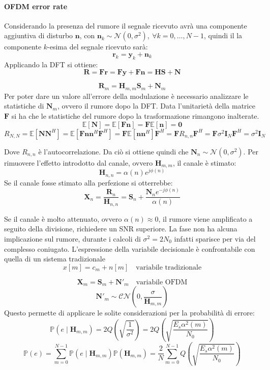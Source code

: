 \paragraph*{OFDM error rate}
Considerando la presenza del rumore il segnale ricevuto avrà una componente aggiuntiva di disturbo $\mathbf{n}$, con $\mathbf{n}_k \sim \mathcal{N}(0, \sigma^2), \ \forall k = 0, \ldots, N-1$, quindi il la componente $k$-esima del segnale ricevuto sarà:
\[
    \mathbf{r}_k = \mathbf{y}_k + \mathbf{n}_k
\]
Applicando la DFT si ottiene:
\[
    \mathbf{R} = \mathbf{F}\mathbf{r} = \mathbf{F}\mathbf{y} + \mathbf{F}\mathbf{n} = \mathbf{H}\mathbf{S} + \mathbf{N}
\]

\[
    \mathbf{R}_{m} = \mathbf{H}_{m, m}\mathbf{S}_{m} + \mathbf{N}_{m}
\]
Per poter dare un valore all'errore della modulazione è necessario analizzare le statistiche di $\mathbf{N}_{m}$, ovvero il rumore dopo la DFT.
Data l'unitarietà della matrice $\mathbf{F}$ si ha che le statistiche del rumore dopo la trasformazione rimangono inalterate.
\[
    \mathbb{E}[\mathbf{N}] = \mathbb{E}[\mathbf{F}\mathbf{n}] = \mathbf{F} \mathbb{E}[\mathbf{n}] = \mathbf{0}
\]  
\[
    R_{N,N} = \mathbb{E}[\mathbf{N}\mathbf{N}^H] = \mathbb{E}[\mathbf{F}\mathbf{n}\mathbf{n}^H\mathbf{F}^H] = \mathbf{F}\mathbb{E}[\mathbf{n}\mathbf{n}^H]\mathbf{F}^H = \mathbf{F}R_{n,n}\mathbf{F}^H = \mathbf{F} \sigma^2 \mathbf{I}_N \mathbf{F}^H = \sigma^2 \mathbf{I}_N
\]

Dove $R_{n,n}$ è l'autocorrelazione. Da ciò si ottiene quindi che $\mathbf{N}_{n} \sim \mathcal{N}(0, \sigma^2)$.
Per rimuovere l'effetto introdotto dal canale, ovvero $\mathbf{H}_{m,m}$, il canale è stimato:
\[
    \mathbf{H}_{n, n}= \alpha(n) e^{j\phi(n)}
\]
Se il canale fosse stimato alla perfezione si otterrebbe:
\[
    \mathbf{X}_{n} = \frac{\mathbf{R}_{n}}{\mathbf{H}_{n, n}} = \mathbf{S}_{n} + \frac{\mathbf{N}_{n} e^{-j\phi(n)}}{\alpha(n)}
\]


Se il canale è molto attenuato, ovvero $\alpha(n) \approx 0$, il rumore viene amplificato a seguito della divisione, richiedere un SNR superiore.
La fase non ha alcuna implicazione sul rumore, durante i calcoli di $\sigma ^2=2N_0$ infatti sparisce per via del complesso coniugato.
L'espressione della variabile decisionale è confrontabile con quella di un sistema tradizionale
\[
    x[m] = c_m + n[m] \quad \text{variabile tradizionale}
\]

\[
    \mathbf{X}_{m} = \mathbf{S}_{m} + \mathbf{N}'_{m} \quad \text{variabile OFDM}
\]
\[
    \mathbf{N}'_{m} \sim \mathcal{CN}(0, \frac{\sigma}{\mathbf{H}_{m, m}})
\]
Questo permette di applicare le solite considerazioni per la probabilità di errore:
\[
    \mathbb{P}(e \mid \mathbf{H}_{m, m}) = 2 Q\left( \sqrt{\frac{1}{\sigma^2}}  \right) = 2 Q\left( \sqrt{\frac{E_s \alpha^2(m)}{N_0}}  \right) 
\]
\[
    \mathbb{P}(e) = \sum_{m=0}^{N-1} \mathbb{P}(e \mid \mathbf{H}_{m, m}) \mathbb{P}(\mathbf{H}_{m,m}) = \frac{2}{N} \sum_{m=0}^{N-1} Q\left( \sqrt{\frac{E_s \alpha^2(m)}{N_0}}  \right)
\]

